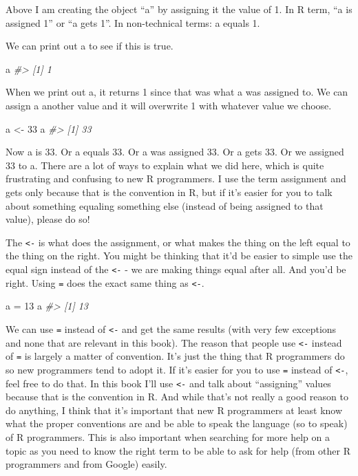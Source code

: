 \documentclass[
]{krantz}
\makeatletter
\newenvironment{Shaded}{\begin{snugshade}}{\end{snugshade}}
\newcommand{\CommentTok}[1]{\textcolor[rgb]{0.37,0.37,0.37}{\textit{#1}}}
\newcommand{\DecValTok}[1]{\textcolor[rgb]{0.06,0.06,0.06}{#1}}
\newcommand{\NormalTok}[1]{#1}
\newcommand{\OtherTok}[1]{\textcolor[rgb]{0.37,0.37,0.37}{#1}}
\newenvironment{kframe}{%
\medskip{}
\setlength{\fboxsep}{.8em}
 \def\at@end@of@kframe{}%
 \ifinner\ifhmode%
  \def\at@end@of@kframe{\end{minipage}}%
  \begin{minipage}{\columnwidth}%
 \fi\fi%
 \def\FrameCommand##1{\hskip\@totalleftmargin \hskip-\fboxsep
 \colorbox{shadecolor}{##1}\hskip-\fboxsep
     \hskip-\linewidth \hskip-\@totalleftmargin \hskip\columnwidth}%
 \MakeFramed {\advance\hsize-\width
   \@totalleftmargin\z@ \linewidth\hsize
   \@setminipage}}%
 {\par\unskip\endMakeFramed%
 \at@end@of@kframe}
\renewenvironment{Shaded}{\begin{kframe}}{\end{kframe}}
\makeatother
\begin{document}
Above I am creating the object ``a'' by assigning it the value of 1. In R term, ``a is assigned 1'' or ``a gets 1''. In non-technical terms: a equals 1.

We can print out a to see if this is true.

\begin{Shaded}
\begin{Highlighting}[]
\NormalTok{a}
\CommentTok{\#\textgreater{} [1] 1}
\end{Highlighting}
\end{Shaded}

When we print out a, it returns 1 since that was what a was assigned to. We can assign a another value and it will overwrite 1 with whatever value we choose.

\begin{Shaded}
\begin{Highlighting}[]
\NormalTok{a }\OtherTok{\textless{}{-}} \DecValTok{33}
\NormalTok{a}
\CommentTok{\#\textgreater{} [1] 33}
\end{Highlighting}
\end{Shaded}

Now a is 33. Or a equals 33. Or a was assigned 33. Or a gets 33. Or we assigned 33 to a. There are a lot of ways to explain what we did here, which is quite frustrating and confusing to new R programmers. I use the term assignment and gets only because that is the convention in R, but if it's easier for you to talk about something equaling something else (instead of being assigned to that value), please do so!

The \texttt{\textless{}-} is what does the assignment, or what makes the thing on the left equal to the thing on the right. You might be thinking that it'd be easier to simple use the equal sign instead of the \texttt{\textless{}-} - we are making things equal after all. And you'd be right. Using \texttt{=} does the exact same thing as \texttt{\textless{}-}.

\begin{Shaded}
\begin{Highlighting}[]
\NormalTok{a }\OtherTok{=} \DecValTok{13}
\NormalTok{a}
\CommentTok{\#\textgreater{} [1] 13}
\end{Highlighting}
\end{Shaded}

We can use \texttt{=} instead of \texttt{\textless{}-} and get the same results (with very few exceptions and none that are relevant in this book). The reason that people use \texttt{\textless{}-} instead of \texttt{=} is largely a matter of convention. It's just the thing that R programmers do so new programmers tend to adopt it. If it's easier for you to use \texttt{=} instead of \texttt{\textless{}-}, feel free to do that. In this book I'll use \texttt{\textless{}-} and talk about ``assigning'' values because that is the convention in R. And while that's not really a good reason to do anything, I think that it's important that new R programmers at least know what the proper conventions are and be able to speak the language (so to speak) of R programmers. This is also important when searching for more help on a topic as you need to know the right term to be able to ask for help (from other R programmers and from Google) easily.
\end{document}

